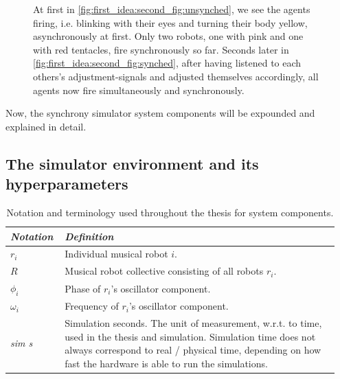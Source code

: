 \begin{figure}[ht!]
{At first in \ref{fig:first_idea:second_fig:unsynched}, we see the agents firing, i.e. blinking with their eyes and turning their body yellow, asynchronously at first. Only two robots, one with pink and one with red tentacles, fire synchronously so far. Seconds later in \ref{fig:first_idea:second_fig:synched}, after having listened to each others's adjustment-signals and adjusted themselves accordingly, all agents now fire simultaneously and synchronously.}
\label{fig:first_idea:second_fig}
\end{figure}

Now, the synchrony simulator system components will be expounded and explained in detail.

	\subsection{The simulator environment and its hyperparameters}
	\label{sim_env_and_hyperparams}
	
	\begin{table}[ht]
		\centering
		\begin{tabular}{p{0.15\linewidth} | p{0.8\linewidth}}
		  \textit{\textbf{Notation}}  & \textit{\textbf{Definition}} \\ \hline
		  $r_i$ & Individual musical robot $i$. \\ \hline
		  $R$ & Musical robot collective consisting of all robots $r_i$. \\ \hline
		  $\phi_i$ & Phase of $r_i$'s oscillator component. \\ \hline
		  $\omega_i$ & Frequency of $r_i$'s oscillator component. \\ \hline
		  \textit{sim s} & Simulation seconds. The unit of measurement, w.r.t. to time, used in the thesis and simulation. Simulation time does not always correspond to real / physical time, depending on how fast the hardware is able to run the simulations.
		\end{tabular}
		\caption{Notation and terminology used throughout the thesis for system components.}
		\label{tab:synchrony_simulator_terminology}
	\end{table}
	
